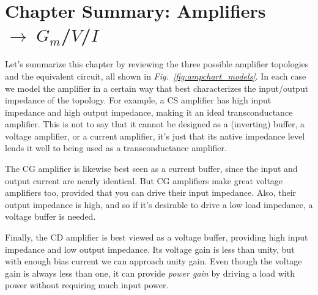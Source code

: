 \section{Chapter Summary: Amplifiers \texorpdfstring{$\rightarrow \; G_m$/$V$/$I$}{}}
Let's summarize this chapter by reviewing the three possible amplifier topologies and the equivalent circuit, all shown in \emph{Fig.~\ref{fig:ampchart_models}}.  In each case we model the amplifier in a certain way that best characterizes the input/output impedance of the topology.  For example, a CS amplifier has high input impedance and high output impedance, making it an ideal transconductance amplifier.  This is not to say that it cannot be designed as a (inverting) buffer, a voltage amplifier, or a current amplifier, it's just that its native impedance level lends it well to being used as a transconductance amplifier.  

The CG amplifier is likewise best seen as a current buffer, since the input and output current are nearly identical.  But CG amplifiers make great voltage amplifiers too, provided that you can drive their input impedance.  Also, their output impedance is high, and so if it's desirable to drive a low load impedance, a voltage buffer is needed.  

Finally, the CD amplifier is best viewed as a voltage buffer, providing high input impedance and low output impedance.  Its voltage gain is less than unity, but with enough bias current we can approach unity gain.  Even though the voltage gain is always less than one, it can provide \emph{power gain} by driving a load with power without requiring much input power.
